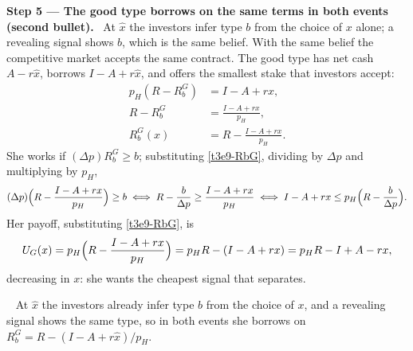 \documentclass[11pt,a4paper]{article}
\newcommand{\step}[2]{\par\medskip\noindent\textbf{Step #1 --- #2.}~}
\newcommand{\answer}[1]{\par\smallskip\noindent\fbox{\textbf{Answer #1.}}~}
\begin{document}
\step{5}{The good type borrows on the same terms in both events (second bullet)} At $\hat x$ the
investors infer type $b$ from the choice of $x$ alone; a revealing signal shows $b$, which is the same
belief. With the same belief the competitive market accepts the same contract. The good type has net
cash $A-r\hat x$, borrows $I-A+r\hat x$, and offers the smallest stake that investors accept:
\begin{align}
  p_H(R-R_b^G) &= I-A+rx, \label{t3e9-be}\\
  R-R_b^G &= \frac{I-A+rx}{p_H}, \nonumber\\
  R_b^G(x) &= R-\frac{I-A+rx}{p_H}. \label{t3e9-RbG}
\end{align}
She works if $(\Delta p)R_b^G\ge b$; substituting \eqref{t3e9-RbG}, dividing by $\Delta p$ and multiplying by $p_H$,
\begin{align}
  (\Delta p)\Bigl(R-\frac{I-A+rx}{p_H}\Bigr) \ge b
  \iff R-\frac{b}{\Delta p}\ge\frac{I-A+rx}{p_H}
  \iff I-A+rx \le p_H\Bigl(R-\frac{b}{\Delta p}\Bigr). \label{t3e9-icG}
\end{align}
Her payoff, substituting \eqref{t3e9-RbG}, is
\begin{align}
  U_G(x) = p_H\Bigl(R-\frac{I-A+rx}{p_H}\Bigr) = p_HR-(I-A+rx) = p_HR-I+A-rx, \label{t3e9-UG}
\end{align}
decreasing in $x$: she wants the cheapest signal that separates.

\answer{(ii-2)} At $\hat x$ the investors already infer type $b$ from the choice of $x$, and a revealing signal shows the same type, so in both events she borrows on $R_b^G=R-(I-A+r\hat x)/p_H$.
\end{document}
